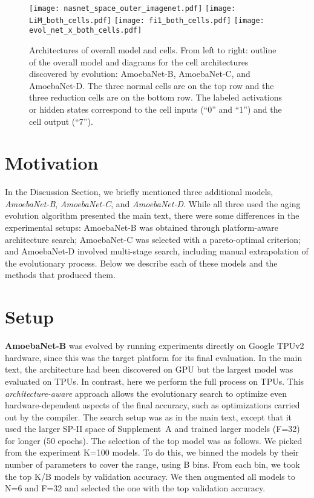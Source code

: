 \documentclass[letterpaper]{article} \usepackage{aaai19}  \usepackage{times}  \usepackage{helvet}  \usepackage{courier}  \usepackage{graphicx}  \frenchspacing
\begin{document}
\begin{figure*}[b]
\centering
\texttt{[image: nasnet\_space\_outer\_imagenet.pdf]}
\hspace{0.03\linewidth}
\texttt{[image: LiM\_both\_cells.pdf]}
\hspace{0.03\linewidth}
\texttt{[image: fi1\_both\_cells.pdf]}
\hspace{0.03\linewidth}
\texttt{[image: evol\_net\_x\_both\_cells.pdf]}
\caption{Architectures of overall model and cells. From left to right: outline of the overall model \cite{zoph2017learning} and diagrams for the cell architectures discovered by evolution: \mbox{AmoebaNet-B}, \mbox{AmoebaNet-C}, and \mbox{AmoebaNet-D}. The three normal cells are on the top row and the three reduction cells are on the bottom row. The labeled activations or hidden states correspond to the cell inputs (``0'' and ``1'') and the cell output (``7'').}
\label{architectures_fig}
\end{figure*}

\section{Motivation}


In the Discussion Section, we briefly mentioned three additional models, \mbox{\textit{AmoebaNet-B}}, \mbox{\textit{AmoebaNet-C}}, and \mbox{\textit{AmoebaNet-D}}. While all three used the aging evolution algorithm presented the main text, there were some differences in the experimental setups: \mbox{AmoebaNet-B} was obtained through platform-aware architecture search; \mbox{AmoebaNet-C} was selected with a pareto-optimal criterion; and \mbox{AmoebaNet-D} involved multi-stage search, including manual extrapolation of the evolutionary process. Below we describe each of these models and the methods that produced them.


\section{Setup}


\mbox{\textbf{AmoebaNet-B}} was evolved by running experiments directly on Google TPUv2 hardware, since this was the target platform for its final evaluation. In the main text, the architecture had been discovered on GPU but the largest model was evaluated on TPUs. In contrast, here we perform the full process on TPUs. This \textit{architecture-aware} approach allows the evolutionary search to optimize even hardware-dependent aspects of the final accuracy, such as optimizations carried out by the compiler. The search setup was as in the main text, except that it used the larger SP-II space of Supplement~A and trained larger models (F=32) for longer (50 epochs). The selection of the top model was as follows. We picked from the experiment K=100 models. To do this, we binned the models by their number of parameters to cover the range, using B bins. From each bin, we took the top K/B models by validation accuracy. We then augmented all models to N=6 and F=32 and selected the one with the top validation accuracy.
\end{document}
